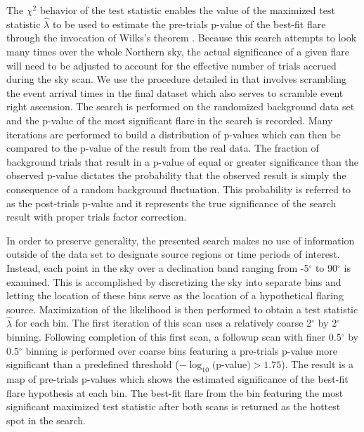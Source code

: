 \documentclass[manuscript]{aastex}
\begin{document}
The $\chi^2$ behavior of the test statistic enables the value of the maximized test statistic $\hat{\lambda}$ to be used to estimate the pre-trials p-value of the best-fit flare through the invocation of Wilks's theorem \citep{wilks1938}. Because this search attempts to look many times over the whole Northern sky, the actual significance of a given flare will need to be adjusted to account for the effective number of trials accrued during the sky scan. We use the procedure detailed in \cite{2015arXiv150300598A} that involves scrambling the event arrival times in the final dataset which also serves to scramble event right ascension. The search is performed on the randomized background data set and the p-value of the most significant flare in the search is recorded. Many iterations are performed to build a distribution of p-values which can then be compared to the p-value of the result from the real data. The fraction of background trials that result in a p-value of equal or greater significance than the observed p-value dictates the probability that the observed result is simply the consequence of a random background fluctuation. This probability is referred to as the post-trials p-value and it represents the true significance of the search result with proper trials factor correction.

In order to preserve generality, the presented search makes no use of information outside of the data set to designate source regions or time periods of interest. Instead, each point in the sky over a declination band ranging from -5$^{\circ}$ to 90$^{\circ}$ is examined. This is accomplished by discretizing the sky into separate bins and letting the location of these bins serve as the location of a hypothetical flaring source. Maximization of the likelihood is then performed to obtain a test statistic $\hat{\lambda}$ for each bin. The first iteration of this scan uses a relatively coarse 2$^{\circ}$ by 2$^{\circ}$ binning. Following completion of this first scan, a followup scan with finer 0.5$^{\circ}$ by 0.5$^{\circ}$ binning is performed over coarse bins featuring a pre-trials p-value more significant than a predefined threshold ($-\log_{10}($p-value$) > 1.75$). The result is a map of pre-trials p-values which shows the estimated significance of the best-fit flare hypothesis at each bin. The best-fit flare from the bin featuring the most significant maximized test statistic after both scans is returned as the hottest spot in the search.
\end{document}
